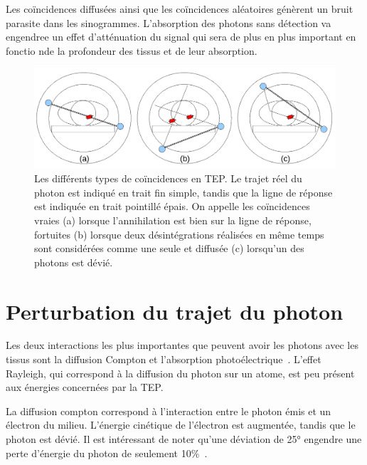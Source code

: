 

Les coïncidences diffusées ainsi que les coïncidences aléatoires génèrent un bruit parasite dans les sinogrammes. L'absorption des photons sans détection va engendree un effet d'atténuation du signal qui sera de plus en plus important en fonctio nde la profondeur des tissus et de leur absorption.


\begin{figure}
\centering
\includegraphics[width=12cm]{images/schemaDetections}
\caption[Les différents types de coïncidences en TEP]{Les différents types de coïncidences en TEP. Le trajet réel du photon est indiqué en trait fin simple, tandis que la ligne de réponse est indiquée en trait pointillé épais. On appelle les coïncidences vraies (a) lorsque l'annihilation est bien sur la ligne de réponse, fortuites (b) lorsque deux désintégrations réalisées en même temps sont considérées comme une seule et diffusée (c) lorsqu'un des photons est dévié.}
\label{fig:schemaDetections}
\end{figure}



	\section{Perturbation du trajet du photon}

Les deux interactions les plus importantes que peuvent avoir les photons avec les tissus sont la diffusion Compton et l'absorption photoélectrique~\cite{cherry2006pet}. L'effet Rayleigh, qui correspond à la diffusion du photon sur un atome, est peu présent aux énergies concernées par la TEP. 

La diffusion compton correspond à l'interaction entre le photon émis et un électron du milieu. L'énergie cinétique de l'électron est augmentée, tandis que le photon est dévié. Il est intéressant de noter qu'une déviation de 25° engendre une perte d'énergie du photon de seulement 10\%~\cite{evans1955atomic}.

